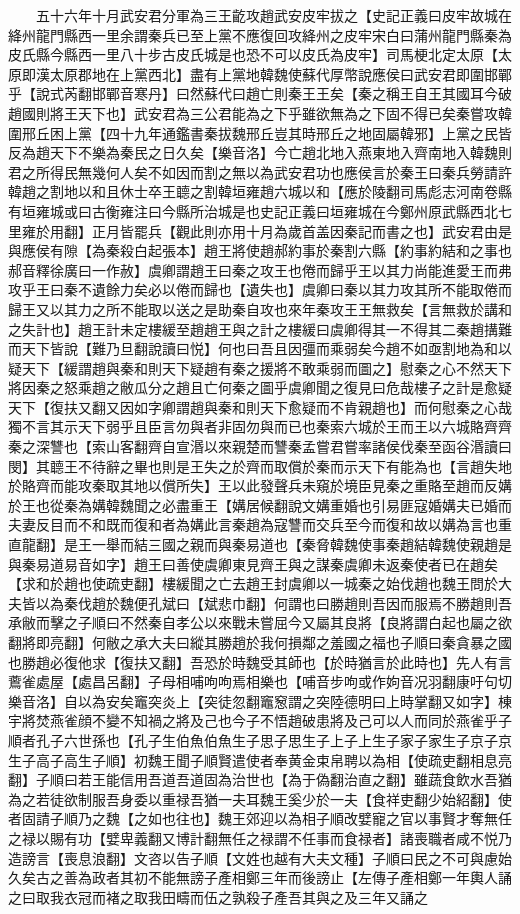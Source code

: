 　　五十六年十月武安君分軍為三王齕攻趙武安皮牢拔之【史記正義曰皮牢故城在絳州龍門縣西一里余謂秦兵已至上黨不應復回攻絳州之皮牢宋白曰蒲州龍門縣秦為皮氏縣今縣西一里八十步古皮氏城是也恐不可以皮氏為皮牢】司馬梗北定太原【太原即漢太原郡地在上黨西北】盡有上黨地韓魏使蘇代厚幣說應侯曰武安君即圍邯鄲乎【說式芮翻邯鄲音寒丹】曰然蘇代曰趙亡則秦王王矣【秦之稱王自王其國耳今破趙國則將王天下也】武安君為三公君能為之下乎雖欲無為之下固不得已矣秦嘗攻韓圍邢丘困上黨【四十九年通鑑書秦拔魏邢丘豈其時邢丘之地固屬韓邪】上黨之民皆反為趙天下不樂為秦民之日久矣【樂音洛】今亡趙北地入燕東地入齊南地入韓魏則君之所得民無幾何人矣不如因而割之無以為武安君功也應侯言於秦王曰秦兵勞請許韓趙之割地以和且休士卒王聼之割韓垣雍趙六城以和【應於陵翻司馬彪志河南卷縣有垣雍城或曰古衡雍注曰今縣所治城是也史記正義曰垣雍城在今鄭州原武縣西北七里雍於用翻】正月皆罷兵【觀此則亦用十月為歲首盖因秦記而書之也】武安君由是與應侯有隙【為秦殺白起張本】趙王將使趙郝約事於秦割六縣【約事約結和之事也郝音釋徐廣曰一作赦】虞卿謂趙王曰秦之攻王也倦而歸乎王以其力尚能進愛王而弗攻乎王曰秦不遺餘力矣必以倦而歸也【遺失也】虞卿曰秦以其力攻其所不能取倦而歸王又以其力之所不能取以送之是助秦自攻也來年秦攻王王無救矣【言無救於講和之失計也】趙王計未定樓緩至趙趙王與之計之樓緩曰虞卿得其一不得其二秦趙搆難而天下皆說【難乃旦翻說讀曰悦】何也曰吾且因彊而乘弱矣今趙不如亟割地為和以疑天下【緩謂趙與秦和則天下疑趙有秦之援將不敢乘弱而圖之】慰秦之心不然天下將因秦之怒乘趙之敝瓜分之趙且亡何秦之圖乎虞卿聞之復見曰危哉樓子之計是愈疑天下【復扶又翻又因如字卿謂趙與秦和則天下愈疑而不肯親趙也】而何慰秦之心哉獨不言其示天下弱乎且臣言勿與者非固勿與而已也秦索六城於王而王以六城賂齊齊秦之深讐也【索山客翻齊自宣湣以來親楚而讐秦孟嘗君嘗率諸侯伐秦至函谷湣讀曰閔】其聼王不待辭之畢也則是王失之於齊而取償於秦而示天下有能為也【言趙失地於賂齊而能攻秦取其地以償所失】王以此發聲兵未窺於境臣見秦之重賂至趙而反媾於王也從秦為媾韓魏聞之必盡重王【媾居候翻說文媾重婚也引易匪寇婚媾夫已婚而夫妻反目而不和既而復和者為媾此言秦趙為寇讐而交兵至今而復和故以媾為言也重直龍翻】是王一舉而結三國之親而與秦易道也【秦脅韓魏使事秦趙結韓魏使親趙是與秦易道易音如字】趙王曰善使虞卿東見齊王與之謀秦虞卿未返秦使者已在趙矣【求和於趙也使疏吏翻】樓緩聞之亡去趙王封虞卿以一城秦之始伐趙也魏王問於大夫皆以為秦伐趙於魏便孔斌曰【斌悲巾翻】何謂也曰勝趙則吾因而服焉不勝趙則吾承敝而擊之子順曰不然秦自孝公以來戰未嘗屈今又屬其良將【良將謂白起也屬之欲翻將即亮翻】何敝之承大夫曰縱其勝趙於我何損鄰之羞國之福也子順曰秦貪暴之國也勝趙必復他求【復扶又翻】吾恐於時魏受其師也【於時猶言於此時也】先人有言鷰雀處屋【處昌呂翻】子母相哺呴呴焉相樂也【哺音步呴或作姁音况羽翻康吁句切樂音洛】自以為安矣竈突炎上【突徒忽翻竈䆫謂之突陸德明曰上時掌翻又如字】棟宇將焚燕雀顔不變不知禍之將及己也今子不悟趙破患將及己可以人而同於燕雀乎子順者孔子六世孫也【孔子生伯魚伯魚生子思子思生子上子上生子家子家生子京子京生子高子高生子順】初魏王聞子順賢遣使者奉黄金束帛聘以為相【使疏吏翻相息亮翻】子順曰若王能信用吾道吾道固為治世也【為于偽翻治直之翻】雖蔬食飲水吾猶為之若徒欲制服吾身委以重禄吾猶一夫耳魏王奚少於一夫【食祥吏翻少始紹翻】使者固請子順乃之魏【之如也往也】魏王郊迎以為相子順改嬖寵之官以事賢才奪無任之禄以賜有功【嬖卑義翻又博計翻無任之禄謂不任事而食禄者】諸喪職者咸不悦乃造謗言【喪息浪翻】文咨以告子順【文姓也越有大夫文種】子順曰民之不可與慮始久矣古之善為政者其初不能無謗子產相鄭三年而後謗止【左傳子產相鄭一年輿人誦之曰取我衣冠而褚之取我田疇而伍之孰殺子產吾其與之及三年又誦之